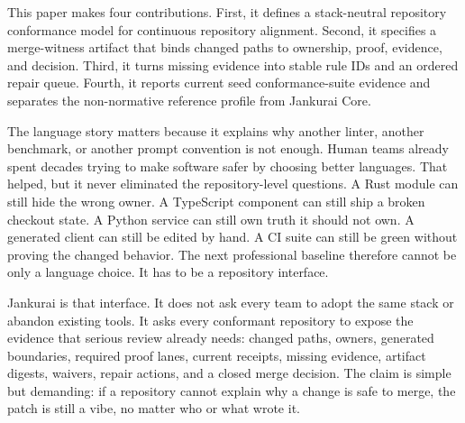 This paper makes four contributions. First, it defines a stack-neutral repository conformance model for continuous repository alignment. Second, it specifies a merge-witness artifact that binds changed paths to ownership, proof, evidence, and decision. Third, it turns missing evidence into stable rule IDs and an ordered repair queue. Fourth, it reports current seed conformance-suite evidence and separates the non-normative reference profile from Jankurai Core.

The language story matters because it explains why another linter, another benchmark, or another prompt convention is not enough. Human teams already spent decades trying to make software safer by choosing better languages. That helped, but it never eliminated the repository-level questions. A Rust module can still hide the wrong owner. A TypeScript component can still ship a broken checkout state. A Python service can still own truth it should not own. A generated client can still be edited by hand. A CI suite can still be green without proving the changed behavior. The next professional baseline therefore cannot be only a language choice. It has to be a repository interface.

Jankurai is that interface. It does not ask every team to adopt the same stack or abandon existing tools. It asks every conformant repository to expose the evidence that serious review already needs: changed paths, owners, generated boundaries, required proof lanes, current receipts, missing evidence, artifact digests, waivers, repair actions, and a closed merge decision. The claim is simple but demanding: if a repository cannot explain why a change is safe to merge, the patch is still a vibe, no matter who or what wrote it.
